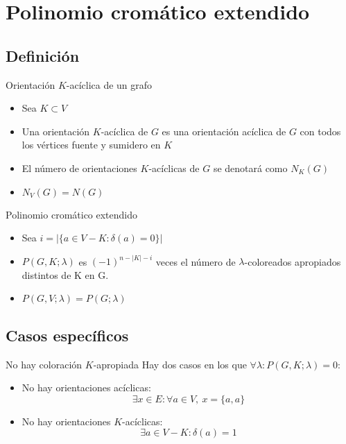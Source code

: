 \documentclass{beamer}
\begin{document}
\section{Polinomio cromático extendido}

\subsection{Definición}

\begin{frame}{Orientación $K$-acíclica de un grafo}
    \begin{itemize}
        \item Sea $K \subset V$
        \item Una orientación $K$-acíclica de $G$ es una orientación acíclica de $G$ con todos los vértices fuente y sumidero en $K$
        \item El número de orientaciones $K$-acíclicas de $G$ se denotará como $N_K(G)$
        \item $N_V(G) = N(G)$
    \end{itemize}
\end{frame}

\begin{frame}{Polinomio cromático extendido}
    \begin{itemize}
        \item Sea $i = |\{a \in V - K : \delta(a) = 0\}|$
        \item $P(G, K; \lambda)$ es $(-1)^{n-|K|-i}$ veces el número de $\lambda$-coloreados apropiados distintos de K en G.
        \item $P(G, V; \lambda) = P(G; \lambda)$
    \end{itemize}
\end{frame}

\subsection{Casos específicos}

\begin{frame}{No hay coloración $K$-apropiada}
    Hay dos casos en los que $\forall \lambda : P(G, K; \lambda) = 0$:
    \begin{itemize}
        \item No hay orientaciones acíclicas:
        \begin{equation*}
            \exists x \in E : \forall a \in V,\ x = \{a, a\}
        \end{equation*}
        \item No hay orientaciones $K$-acíclicas:
        \begin{equation*}
            \exists a \in V - K : \delta(a) = 1
        \end{equation*}
    \end{itemize}
\end{frame}
\end{document}
